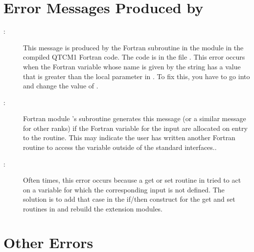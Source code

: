 %


%
\section{Error Messages Produced by }

\begin{description}
\item[
	:]
	This message is produced by the Fortran
	subroutine 
	in the module  in the compiled QTCM1 Fortran code.
	The code is in the file .  This error occurs when
	the Fortran variable whose name is given by the string 
	has a value that is greater than the local parameter
	 in .  To fix this, you have
	to go into  and change the value of
	.

\item[:]
	Fortran module 's subroutine
	 generates this message
	(or a similar message for other ranks) if the Fortran
	variable for the input  are allocated on entry
	to the routine.  This may indicate the user has written another
	Fortran routine to access the  variable
	outside of the standard interfaces..

\item[:]
	Often times, this error occurs because a get or set routine
	in  tried to act on a variable for which the
	corresponding input  is not defined.  The solution
	is to add that case in the if/then construct for the get and set
	routines in  and rebuild the extension modules.
\end{description}


\section{Other Errors}

